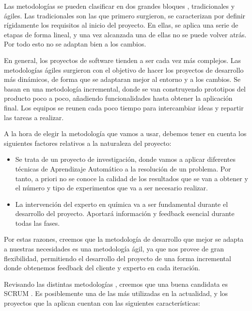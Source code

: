Las metodologías se pueden clasificar en dos grandes bloques \cite{metodologiasDesarrollo}, tradicionales y ágiles. Las tradicionales son las que primero surgieron, se caracterizan por definir rígidamente los requisitos al inicio del proyecto. En ellas, se aplica una serie de etapas de forma lineal, y una vez alcanzada una de ellas no se puede volver atrás. Por todo esto no se adaptan bien a los cambios.

En general, los proyectos de software tienden a ser cada vez más complejos. Las metodologías ágiles surgieron con el objetivo de hacer los proyectos de desarrollo más dinámicos, de forma que se adaptaran mejor al entorno y a los cambios. Se basan en una metodología incremental, donde se van construyendo prototipos del producto poco a poco, añadiendo funcionalidades hasta obtener la aplicación final. Los equipos se reunen cada poco tiempo para intercambiar ideas y repartir las tareas a realizar.

A la hora de elegir la metodología que vamos a usar, debemos tener en cuenta los siguientes factores relativos a la naturaleza del proyecto:

\begin{itemize}
    \item Se trata de un proyecto de investigación, donde vamos a aplicar diferentes técnicas de Aprendizaje Automático a la resolución de un problema. Por tanto, a priori no se conoce la calidad de los resultados que se van a obtener y el número y tipo de experimentos que va a ser necesario realizar.
    \item La intervención del experto en química va a ser fundamental durante el desarrollo del proyecto. Aportará información y feedback esencial durante todas las fases.
\end{itemize}

Por estas razones, creemos que la metodología de desarrollo que mejor se adapta a nuestras necesidades es una metodología ágil, ya que nos provee de gran flexibilidad, permitiendo el desarrollo del proyecto de una forma incremental donde obtenemos feedback del cliente y experto en cada iteración.

Revisando las distintas metodologías \cite{despa2014comparative}, creemos que una buena candidata es SCRUM \cite{schwaber1997scrum}. Es posiblemente una de las más utilizadas en la actualidad, y los proyectos que la aplican cuentan con las siguientes características:

